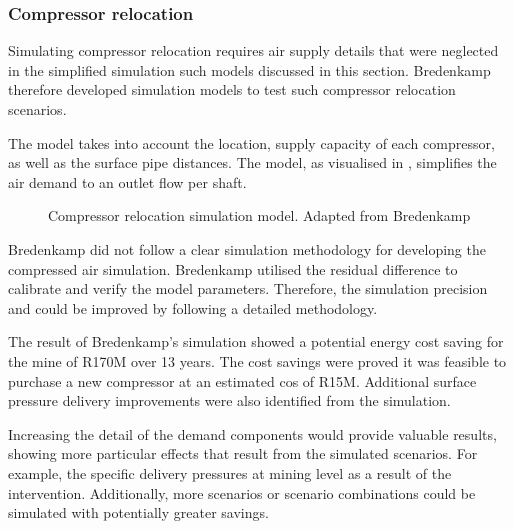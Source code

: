 \subsubsection{Compressor relocation}
Simulating compressor relocation requires air supply details that were neglected in the simplified simulation such models discussed in this section. Bredenkamp \cite{Bredenkamp2013Masters} therefore developed simulation models to test such compressor relocation scenarios. 
\par
The model takes into account the location, supply capacity of each compressor, as well as the surface pipe distances. The model, as visualised in , simplifies the air demand to an outlet flow per shaft.
\par
\begin{figure}[h!]
	\centering
	\caption[Compressor relocation simulation model]{Compressor relocation simulation model. Adapted from Bredenkamp \cite{Bredenkamp2013Masters}}
	\label{fig: bredenkamp model}
\end{figure} 
Bredenkamp did not follow a clear simulation methodology for developing the compressed air simulation. Bredenkamp utilised the residual difference to calibrate and verify the model parameters. Therefore, the simulation precision and could be improved by following a detailed methodology.
\par 
The result of Bredenkamp's simulation showed a potential energy cost saving for the mine of R170M over 13 years. The cost savings were proved it was feasible to purchase a new compressor at an estimated cos of R15M. Additional surface pressure delivery improvements were also identified from the simulation.
\par
Increasing the detail of the demand components would provide valuable results, showing more particular effects that result from the simulated scenarios. For example, the specific delivery pressures at mining level as a result of the intervention. Additionally, more scenarios or scenario combinations could be simulated with potentially greater savings.

